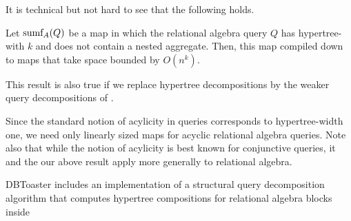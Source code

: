 It is technical but not hard to see that the following holds.


\begin{theorem}
Let $\mbox{sumf}_A(Q)$ be a map in which the relational algebra query $Q$ has hypertree-with
$k$ and does not contain a nested aggregate. Then, this map compiled down to
maps that take space bounded by $O(n^k)$.
\end{theorem}


This result is also true if we replace hypertree decompositions by the weaker
query decompositions of \cite{CR1997}.

Since the standard notion of acylicity in queries  \cite{Yan81, AHV95}
corresponds to hypertree-width one, we need only linearly sized maps for acyclic
relational algebra queries. Note also that while the notion of acylicity is best known
for conjunctive queries, it and the our above result apply more generally
to relational algebra.

DBToaster includes an implementation of a structural query decomposition algorithm
that computes hypertree compositions for relational algebra blocks inside


